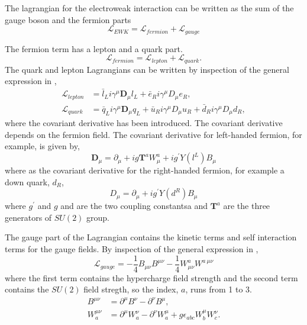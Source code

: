 The lagrangian for the electroweak interaction can be written as the sum of the
gauge boson and the fermion parts
\begin{equation}
\mathcal{L}_{EWK} = 
\mathcal{L}_{fermion}
+ \mathcal{L}_{gauge}
\end{equation}


The fermion term has a lepton and a quark part.
\begin{equation}
\mathcal{L}_{fermion} =
 \mathcal{L}_{lepton}
+ \mathcal{L}_{quark}.
\end{equation}
The quark and lepton Lagrangians can be written by inspection of the general
expression in ,
\begin{align*}
\mathcal{L}_{lepton} &= 
\bar{l}_{L} i \gamma^{\mu} \mathbf{D}_{\mu} l_{L} +
\bar{e}_{R} i \gamma^{\mu} D_{\mu} e_{R}, \\
\mathcal{L}_{quark} &= 
\bar{q}_{L} i \gamma^{\mu} \mathbf{D}_{\mu} q_{L} +
\bar{u}_{R} i \gamma^{\mu} D_{\mu} u_{R} +
\bar{d}_{R} i \gamma^{\mu} D_{\mu} d_{R},
\end{align*}
where the covariant derivative has been introduced.
The covariant derivative depends on the fermion field. The covariant derivative
for left-handed fermion, for example, is given by,
\begin{equation}
\mathbf{D}_\mu 
= \partial_\mu 
+ ig\mathbf{T}^{a}W_{\mu}^{a}
+ ig^{\prime}Y(l^{L})B_{\mu}
\end{equation}
where as the covariant derivative for the right-handed fermion, for example a
down quark, $d_R$,
\begin{equation}
D_\mu = \partial_\mu + ig^{\prime}Y(d^{R})B_{\mu}
\end{equation}
where $g^\prime$ and $g$ and are the two coupling constantsa and
$\mathbf{T}^{a}$ are the three generators of $SU(2)$ group.

The gauge part of the Lagrangian contains the kinetic terms and self interaction
terms for the gauge fields. By inspection of the general expression in
,
\begin{equation}
\mathcal{L}_{gauge} = 
- \frac{1}{4} B_{\mu\nu} B^{\mu\nu}
- \frac{1}{4} W^{a}_{\mu\nu} W^{a~\mu\nu}
\end{equation}
where the first term contains the hypercharge field strength and the second term 
contains the $SU(2)$ field stregth, so the index, $a$, runs from 1 to 3.
\begin{align*}
B^{\mu\nu}     &= \partial^{\mu} B^{\nu} - \partial^{\nu} B^{\mu},\\
W_{a}^{\mu\nu} &= \partial^{\mu} W_{a}^{\nu} - \partial^{\nu} W_{a}^{\mu} 
                + g \epsilon_{abc} W_{b}^{\mu} W_{c}^{\nu}.
\end{align*}

